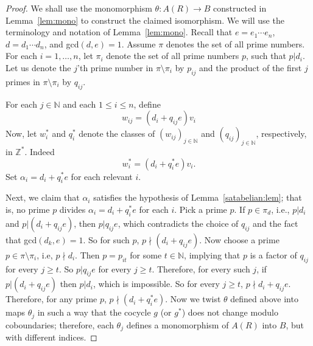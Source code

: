 \documentclass{article}
\theoremstyle{remark}
\def\N{{\mathbb{N}}}
\def\Z{{\mathbb{Z}}}
\begin{document}
\begin{proof}
We shall use the monomorphism $\theta: A(R)\to B$ constructed in Lemma~\ref{lem:mono} to construct the claimed isomorphism. We will use the terminology and notation of Lemma~\ref{lem:mono}.  Recall that $e=e_{1}\cdots e_{n}$, $d=d_1\cdots d_n$, and gcd$(d,e)=1$. Assume $\pi$ denotes the set of all prime numbers. For each $i=1, \ldots, n$, let $\pi_i$ denote the set of all prime numbers $p$, such that $p|d_i$. Let us denote the $j$'th prime number in $\pi\setminus \pi_i$ by $p_{ij}$ and the product of the first $j$ primes in $\pi\setminus \pi_i$ by $q_{ij}$.
 
       For each $j\in \N$ and each $1\leq i \leq n$, define 
 $$w_{ij}=(d_i+q_{ij}e) v_i$$
 Now, let $w_i^*$ and $q_i^*$ denote the classes of $(w_{ij})_{j\in \N}$ and $(q_{ij})_{j\in \N}$, respectively, in $\Z^*$. Indeed $$w^*_i=(d_i+q_i^*e)v_i.$$ Set $\alpha_i=d_i+q_i^*e$ for each relevant $i$.

 Next, we claim that $\alpha_i$ satisfies the hypothesis of Lemma~\ref{satabelian:lem}; that is, no prime $p$ divides $\alpha_i=d_i+q_i^*e$ for each $i$. Pick a prime $p$. If $p\in \pi_d$, i.e., $p|d_i$ and $p|(d_i+q_{ij}e)$, then $p|q_{ij}e$, which contradicts the choice of $q_{ij}$ and the fact that gcd$(d_k,e)=1$. So for such $p$, $p\nmid (d_i+q_{ij}e)$. Now choose a prime $p\in \pi\setminus \pi_i$, i.e, $p\nmid d_{i}$. Then $p=p_{it}$ for some $t\in \N$, implying that $p$ is a factor of $q_{ij}$ for every $j\geq t$. So $p|q_{ij}e$ for every $j\geq t$. Therefore, for every such $j$, if $p|(d_i+q_{ij}e)$ then $p|d_i$, which is impossible. So for every $j\geq t$, $p\nmid d_i+q_{ij}e$. Therefore, for any prime $p$, $p\nmid (d_i+q_{i}^*e)$.
 Now we twist $\theta$ defined above into maps $\theta_j$ in such a way that the cocycle $g$ (or $g^*$) does not change modulo coboundaries; therefore, each $\theta_j$
 defines a monomorphism of $A(R)$ into $B$, but with different indices.
  

\end{proof}
\end{document}
